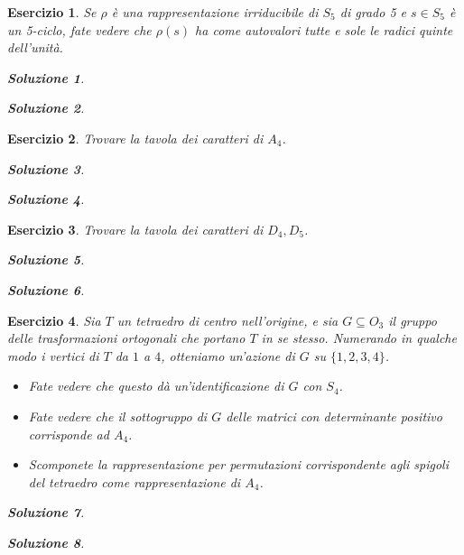 \documentclass[a4paper]{article}
\theoremstyle{break}
\newtheorem{ex}{{ \Large Esercizio} }
\theoremstyle{plain}
\newtheorem{sol}{Soluzione}[ex]
\begin{document}
\begin{ex}
Se $\rho$ è una rappresentazione irriducibile di $S_5$ di grado 5 e $s \in S_5$ è un 5-ciclo, fate vedere che $\rho(s)$ ha come autovalori tutte e sole le radici quinte dell’unità.

\begin{sol}

\end{sol}

\begin{sol}

\end{sol}


\end{ex}

\begin{ex}
Trovare la tavola dei caratteri di $A_4$.

\begin{sol}

\end{sol}

\begin{sol}

\end{sol}


\end{ex}

\begin{ex}
Trovare la tavola dei caratteri di $D_4, D_5$.

\begin{sol}

\end{sol}

\begin{sol}

\end{sol}


\end{ex}

\begin{ex}
Sia $T$ un tetraedro di centro nell'origine, e sia $G \subseteq O_3$ il gruppo delle trasformazioni ortogonali che portano $T$ in se stesso. Numerando in qualche modo i vertici di $T$ da $1$ a $4$, otteniamo un’azione di $G$ su $\{1, 2, 3, 4\}$.
\begin{itemize}
\item[(a)] Fate vedere che questo dà un’identificazione di $G$ con $S_4$.

\item[(b)] Fate vedere che il sottogruppo di $G$ delle matrici con determinante positivo corrisponde ad $A_4$.

\item[(c)] Scomponete la rappresentazione per permutazioni corrispondente agli spigoli del tetraedro come rappresentazione di $A_4$.
\end{itemize}

\begin{sol}

\end{sol}

\begin{sol}

\end{sol}


\end{ex}
\end{document}
